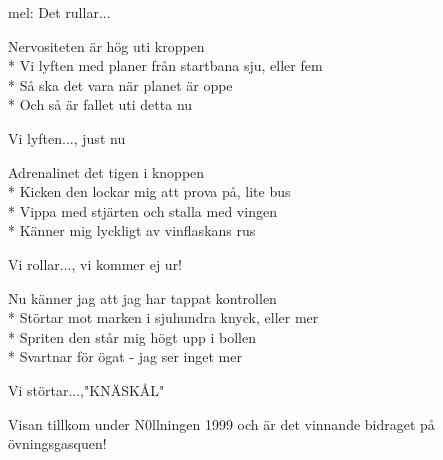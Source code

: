 \begin{SongText}
    \begin{SongInfo}
        mel: Det rullar...
    \end{SongInfo}
    \begin{SongVerse}
        Nervositeten är hög uti kroppen\\*%
        Vi lyften med planer från startbana sju, eller fem\\*%
        Så ska det vara när planet är oppe\\*%
        Och så är fallet uti detta nu
    \end{SongVerse}
    \begin{SongVerse}
        Vi lyften..., just nu
    \end{SongVerse}
    \begin{SongVerse}
        Adrenalinet det tigen i knoppen\\*%
        Kicken den lockar mig att prova på, lite bus\\*%
        Vippa med stjärten och stalla med vingen\\*%
        Känner mig lyckligt av vinflaskans rus
    \end{SongVerse}
    \begin{SongVerse}
        Vi rollar..., vi kommer ej ur!
    \end{SongVerse}
    \begin{SongVerse}
        Nu känner jag att jag har tappat kontrollen\\*%
        Störtar mot marken i sjuhundra knyck, eller mer\\*%
        Spriten den står mig högt upp i bollen\\*%
        Svartnar för ögat - jag ser inget mer
    \end{SongVerse}
    \begin{SongVerse}
        Vi störtar...,"KNÄSKÅL"
    \end{SongVerse}
    \begin{SongInfo}
        Visan tillkom under N0llningen 1999 och är det vinnande bidraget på övningsgasquen!
    \end{SongInfo}
\end{SongText}

